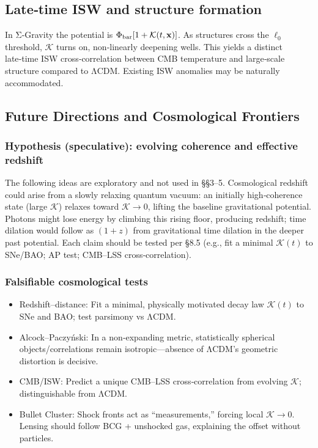\documentclass[11pt,a4paper]{article}
\begin{document}
\subsection{Late‑time ISW and structure formation}


In Σ‑Gravity the potential is $\Phi_{\rm bar}[1+\mathcal{K}(t,\mathbf{x})]$. As structures cross the $\ell_0$ threshold, $\mathcal{K}$ turns on, non‑linearly deepening wells. This yields a distinct late‑time ISW cross‑correlation between CMB temperature and large‑scale structure compared to ΛCDM. Existing ISW anomalies may be naturally accommodated.


\subsection{Future Directions and Cosmological Frontiers}


\subsubsection{Hypothesis (speculative): evolving coherence and effective redshift}


The following ideas are exploratory and not used in §§3–5. Cosmological redshift could arise from a slowly relaxing quantum vacuum: an initially high‑coherence state (large $\mathcal{K}$) relaxes toward $\mathcal{K}\to0$, lifting the baseline gravitational potential. Photons might lose energy by climbing this rising floor, producing redshift; time dilation would follow as $(1+z)$ from gravitational time dilation in the deeper past potential. Each claim should be tested per §8.5 (e.g., fit a minimal $\mathcal{K}(t)$ to SNe/BAO; AP test; CMB–LSS cross‑correlation).


\subsubsection{Falsifiable cosmological tests}


\begin{itemize}
\item Redshift–distance: Fit a minimal, physically motivated decay law $\mathcal{K}(t)$ to SNe and BAO; test parsimony vs ΛCDM.
\item Alcock–Paczyński: In a non‑expanding metric, statistically spherical objects/correlations remain isotropic—absence of ΛCDM’s geometric distortion is decisive.
\item CMB/ISW: Predict a unique CMB–LSS cross‑correlation from evolving $\mathcal{K}$; distinguishable from ΛCDM.
\item Bullet Cluster: Shock fronts act as “measurements,” forcing local $\mathcal{K}\to0$. Lensing should follow BCG + unshocked gas, explaining the offset without particles.
\end{itemize}
\end{document}
